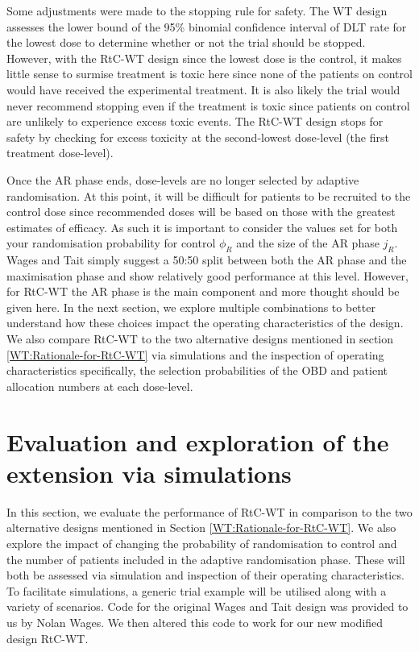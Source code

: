 Some adjustments were made to the stopping rule for safety. The WT design assesses the lower bound of the 95\% binomial confidence interval of DLT rate for the lowest dose to determine whether or not the trial should be stopped. However, with the RtC-WT design since the lowest dose is the control, it makes little sense to surmise treatment is toxic here since none of the patients on control would have received the experimental treatment. It is also likely the trial would never recommend stopping even if the treatment is toxic since patients on control are unlikely to experience excess toxic events. The RtC-WT design stops for safety by checking for excess toxicity at the second-lowest dose-level (the first treatment dose-level).

Once the AR phase ends, dose-levels are no longer selected by adaptive randomisation. At this point, it will be difficult for patients to be recruited to the control dose since recommended doses will be based on those with the greatest estimates of efficacy. As such it is important to consider the values set for both your randomisation probability for control $\phi_R$ and the size of the AR phase $j_R$. Wages and Tait simply suggest a 50:50 split between both the AR phase and the maximisation phase and show relatively good performance at this level. However, for RtC-WT the AR phase is the main component and more thought should be given here. In the next section, we explore multiple combinations to better understand how these choices impact the operating characteristics of the design. We also compare RtC-WT to the two alternative designs mentioned in section  \ref{WT:Rationale-for-RtC-WT} via simulations and the inspection of operating characteristics specifically, the selection probabilities of the OBD and patient allocation numbers at each dose-level. 

\section{Evaluation and exploration of the extension via simulations}
\label{WT:Evaluation-of-the-Extension}

In this section, we evaluate the performance of RtC-WT in comparison to the two alternative designs mentioned in Section \ref{WT:Rationale-for-RtC-WT}. We also explore the impact of changing the probability of randomisation to control and the number of patients included in the adaptive randomisation phase. These will both be assessed via simulation and inspection of their operating characteristics. To facilitate simulations, a generic trial example will be utilised along with a variety of scenarios. Code for the original Wages and Tait design was provided to us by Nolan Wages. We then altered this code to work for our new modified design RtC-WT. 

